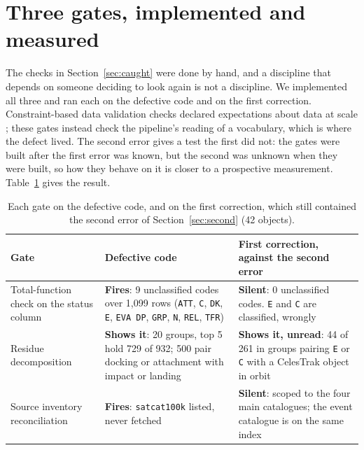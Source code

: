 \section{Three gates, implemented and measured}
\label{sec:gates}

The checks in Section~\ref{sec:caught} were done by hand, and a discipline that
depends on someone deciding to look again is not a discipline. We implemented
all three and ran each on the defective code and on the first correction.
Constraint-based data validation checks declared expectations about data at
scale \citep{schelter2018deequ}; these gates instead check the pipeline's reading
of a vocabulary, which is where the defect lived. The second error gives a test
the first did not: the gates were built after the first error was known, but the
second was unknown when they were built, so how they behave on it is closer to a
prospective measurement. Table~\ref{tab:gates} gives the result.

\begin{table}[t]
\centering
\small
\caption{Each gate on the defective code, and on the first correction, which
still contained the second error of Section~\ref{sec:second} (42 objects).}
\label{tab:gates}
\begin{tabular}{>{\raggedright\arraybackslash}p{2.5cm}>{\raggedright\arraybackslash}p{3.9cm}>{\raggedright\arraybackslash}p{5.4cm}}
\toprule
Gate & Defective code & First correction, against the second error \\
\midrule
Total-function check on the status column &
\textbf{Fires}: 9 unclassified codes over 1{,}099 rows (\texttt{ATT},
\texttt{C}, \texttt{DK}, \texttt{E}, \texttt{EVA DP}, \texttt{GRP}, \texttt{N},
\texttt{REL}, \texttt{TFR}) &
\textbf{Silent}: 0 unclassified codes. \texttt{E} and \texttt{C} are classified,
wrongly \\
\addlinespace
Residue decomposition &
\textbf{Shows it}: 20 groups, top 5 hold 729 of 932; 500 pair docking or
attachment with impact or landing &
\textbf{Shows it, unread}: 44 of 261 in groups pairing \texttt{E} or \texttt{C}
with a CelesTrak object in orbit \\
\addlinespace
Source inventory reconciliation &
\textbf{Fires}: \texttt{satcat100k} listed, never fetched &
\textbf{Silent}: scoped to the four main catalogues; the event catalogue is on
the same index \\
\bottomrule
\end{tabular}
\end{table}

